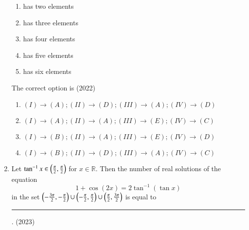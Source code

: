 \begin{enumerate}[label=\thesubsection.\arabic*,ref=\thesubsection.\theenumi]
\begin{multicols}{2}
	\begin{enumerate}[label=(\Alph*)]
  \item 	  has two elements
  \item 	 has three elements 
  \item          has four elements 
  \item 	 has five elements
\item 	 	  has six elements
\end{enumerate}
\end{multicols}
  The correct option is 
	\hfill (2022)
\begin{enumerate}
 \item  $(I)\to(A);(II)\to(D);(III)\to(A);(IV)\to(D)$
 \item  $(I)\to(A);(II)\to(A);(III)\to(E);(IV)\to(C)$
 \item  $(I)\to(B);(II)\to(A);(III)\to(E);(IV)\to(D)$
 \item  $(I)\to(B);(II)\to(D);(III)\to(A);(IV)\to(C)$
\end{enumerate}
\item Let $\tan^{-1}x \in \left(\frac{\pi}{2},\frac{\pi}{2}\right)$ for $x \in \mathbb{R}$. Then the number of real solutions of the equation  
	$$ {1 + \cos(2x)} = 2 \tan^{-1} (\tan x) $$ 
in the set $ \left(-\frac{3\pi}{2},-\frac{\pi}{2}\right)\cup \left( -\frac{\pi}{2}, \frac{\pi}{2}\right) \cup \left( \frac{\pi}{2}, \frac{3\pi}{2}\right) $ is equal to \rule{1cm}{0.1pt}.
%
\hfill (2023)
\end{enumerate}
